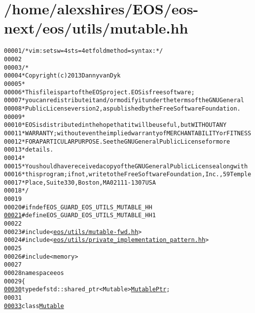 \hypertarget{mutable_8hh_source}{
\section{/home/alexshires/EOS/eos-\/next/eos/utils/mutable.hh}
}


\begin{footnotesize}\begin{alltt}
00001 \textcolor{comment}{/* vim: set sw=4 sts=4 et foldmethod=syntax : */}
00002 
00003 \textcolor{comment}{/*}
00004 \textcolor{comment}{ * Copyright (c) 2013 Danny van Dyk}
00005 \textcolor{comment}{ *}
00006 \textcolor{comment}{ * This file is part of the EOS project. EOS is free software;}
00007 \textcolor{comment}{ * you can redistribute it and/or modify it under the terms of the GNU General}
00008 \textcolor{comment}{ * Public License version 2, as published by the Free Software Foundation.}
00009 \textcolor{comment}{ *}
00010 \textcolor{comment}{ * EOS is distributed in the hope that it will be useful, but WITHOUT ANY}
00011 \textcolor{comment}{ * WARRANTY; without even the implied warranty of MERCHANTABILITY or FITNESS}
00012 \textcolor{comment}{ * FOR A PARTICULAR PURPOSE.  See the GNU General Public License for more}
00013 \textcolor{comment}{ * details.}
00014 \textcolor{comment}{ *}
00015 \textcolor{comment}{ * You should have received a copy of the GNU General Public License along with}
00016 \textcolor{comment}{ * this program; if not, write to the Free Software Foundation, Inc., 59 Temple}
00017 \textcolor{comment}{ * Place, Suite 330, Boston, MA  02111-1307  USA}
00018 \textcolor{comment}{ */}
00019 
00020 \textcolor{preprocessor}{#ifndef EOS\_GUARD\_EOS\_UTILS\_MUTABLE\_HH}
\hypertarget{mutable_8hh_source_l00021}{}\hyperlink{mutable_8hh_af601921bc46cf0f74dabe66ca841b6e8}{00021} \textcolor{preprocessor}{}\textcolor{preprocessor}{#define EOS\_GUARD\_EOS\_UTILS\_MUTABLE\_HH 1}
00022 \textcolor{preprocessor}{}
00023 \textcolor{preprocessor}{#include <\hyperlink{mutable-fwd_8hh}{eos/utils/mutable-fwd.hh}>}
00024 \textcolor{preprocessor}{#include <\hyperlink{private__implementation__pattern_8hh}{eos/utils/private_implementation_pattern.hh}>}
00025 
00026 \textcolor{preprocessor}{#include <memory>}
00027 
00028 \textcolor{keyword}{namespace }eos
00029 \{
\hypertarget{mutable_8hh_source_l00030}{}\hyperlink{namespaceeos_a0ab446e6a801d96a1ee83bb7c070686f}{00030}     \textcolor{keyword}{typedef} std::shared\_ptr<Mutable> \hyperlink{namespaceeos_a0ab446e6a801d96a1ee83bb7c070686f}{MutablePtr};
00031 
\hypertarget{mutable_8hh_source_l00033}{}\hyperlink{classeos_1_1Mutable}{00033}     \textcolor{keyword}{class }\hyperlink{classeos_1_1Mutable}{Mutable}

\end{alltt}
\end{footnotesize}
